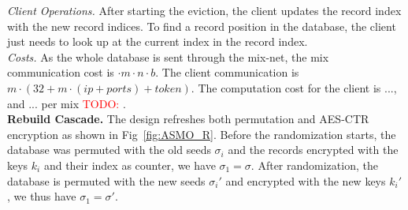 \documentclass[USenglish,oneside,twocolumn]{article}
\newcommand{\todo}[1]{\textcolor{red}{TODO: #1}}
\begin{document}
\noindent\textit{Client Operations.} After starting the eviction, the client updates the record index with the new record indices. To find a record position in the database, the client just needs to look up at the current index in the record index.\\

\noindent\textit{Costs.}
As the whole database is sent through the mix-net, the mix communication cost is $ \cdot m \cdot n \cdot b$. The client communication is $m \cdot (32+ m\cdot (ip +ports)+ token)$.
The computation cost for the client is ..., and ... per mix  \todo{}.\\


\noindent\textbf{Rebuild Cascade.} The design refreshes both permutation and AES-CTR encryption as shown in Fig~\ref{fig:ASMO_R}. Before the randomization starts, the database was permuted with the old seeds $\sigma_i$ and the records encrypted with the keys $k_i$ and their index as counter, we have $\sigma_1=\sigma$.
After randomization, the database is permuted with the new seeds $\sigma_i'$ and encrypted with the new keys $k_i'$, we thus have $\sigma_1=\sigma'$.
\end{document}
